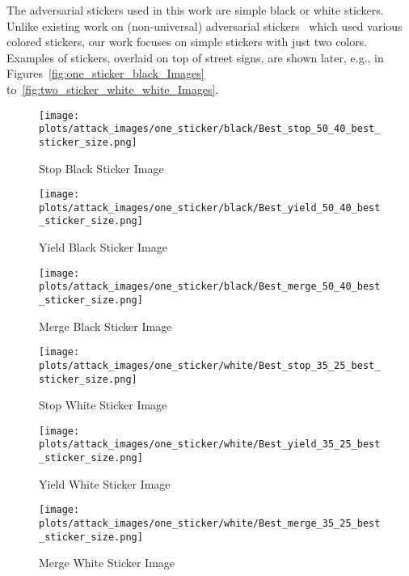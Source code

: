 The adversarial stickers used in this work are simple black or white stickers. Unlike existing work on (non-universal) adversarial stickers~\cite{9779913} which used various colored stickers, our work focuses on simple stickers with just two colors. Examples of stickers, overlaid on top of street signs, are shown later, e.g., in Figures~\ref{fig:one_sticker_black_Images} to~\ref{fig:two_sticker_white_white_Images}.

\begin{figure*}[t]
    \begin{subfigure}[b]{0.25\textwidth}
        \centering
\texttt{[image: plots/attack\_images/one\_sticker/black/Best\_stop\_50\_40\_best\_sticker\_size.png]}
        \caption{\small \centering Stop Black Sticker Image}
        \label{fig:Best_stop_black_one_sticker}
    \end{subfigure}
    \hfill
    \begin{subfigure}[b]{0.25\textwidth}
        \centering
         \texttt{[image: plots/attack\_images/one\_sticker/black/Best\_yield\_50\_40\_best\_sticker\_size.png]}
        \caption{\small \centering Yield Black Sticker Image}
        \label{fig:Best_yield_black_one_sticker}
    \end{subfigure}
    \hfill
    \begin{subfigure}[b]{0.25\textwidth}
        \centering
   \texttt{[image: plots/attack\_images/one\_sticker/black/Best\_merge\_50\_40\_best\_sticker\_size.png]}
        \caption{\small \centering Merge Black Sticker Image}
        \label{fig:Best_merge_black_one_sticker}
    \end{subfigure}
    \vspace{-1em}
    \caption{Single Black sticker attack images.}
    \label{fig:one_sticker_black_Images}
\end{figure*}

\begin{figure*}[t]
    \begin{subfigure}[b]{0.25\textwidth}
        \centering
\texttt{[image: plots/attack\_images/one\_sticker/white/Best\_stop\_35\_25\_best\_sticker\_size.png]}
        \caption{\small \centering Stop White Sticker Image}
        \label{fig:Best_stop_white_one_sticker}
    \end{subfigure}
    \hfill
    \begin{subfigure}[b]{0.25\textwidth}
        \centering
         \texttt{[image: plots/attack\_images/one\_sticker/white/Best\_yield\_35\_25\_best\_sticker\_size.png]}
        \caption{\small \centering Yield White Sticker Image}
        \label{fig:Best_yield_white_one_sticker}
    \end{subfigure}
    \hfill
    \begin{subfigure}[b]{0.25\textwidth}
        \centering
   \texttt{[image: plots/attack\_images/one\_sticker/white/Best\_merge\_35\_25\_best\_sticker\_size.png]}
        \caption{\small \centering Merge White Sticker Image}
        \label{fig:Best_merge_white_one_sticker}
    \end{subfigure}
    \vspace{-1em}
    \caption{Single White sticker attack images.}
    \label{fig:one_sticker_white_Images}
\end{figure*}
